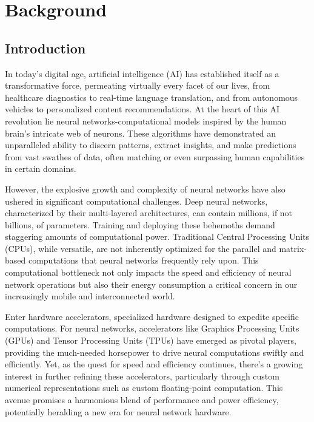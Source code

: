 \chapter{Background}\label{chap.background}
\minitoc


\section{Introduction}
In today's digital age, artificial intelligence (AI) has established itself as a transformative force, permeating virtually every facet of our lives, from healthcare diagnostics to real-time language translation, and from autonomous vehicles to personalized content recommendations. At the heart of this AI revolution lie neural networks-computational models inspired by the human brain's intricate web of neurons. These algorithms have demonstrated an unparalleled ability to discern patterns, extract insights, and make predictions from vast swathes of data, often matching or even surpassing human capabilities in certain domains.

However, the explosive growth and complexity of neural networks have also ushered in significant computational challenges. Deep neural networks, characterized by their multi-layered architectures, can contain millions, if not billions, of parameters. Training and deploying these behemoths demand staggering amounts of computational power. Traditional Central Processing Units (CPUs), while versatile, are not inherently optimized for the parallel and matrix-based computations that neural networks frequently rely upon. This computational bottleneck not only impacts the speed and efficiency of neural network operations but also their energy consumption a critical concern in our increasingly mobile and interconnected world.

Enter hardware accelerators, specialized hardware designed to expedite specific computations. For neural networks, accelerators like Graphics Processing Units (GPUs) and Tensor Processing Units (TPUs) have emerged as pivotal players, providing the much-needed horsepower to drive neural computations swiftly and efficiently. Yet, as the quest for speed and efficiency continues, there's a growing interest in further refining these accelerators, particularly through custom numerical representations such as custom floating-point computation. This avenue promises a harmonious blend of performance and power efficiency, potentially heralding a new era for neural network hardware.

